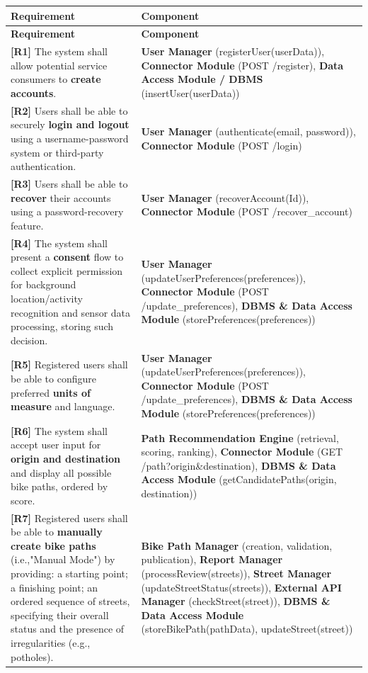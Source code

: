 \documentclass{Configuration_Files/PoliMi3i_thesis}
\begin{document}
    \begin{longtable}{|p{}|p{}|}
    
    \hline
    \textbf{Requirement} & \textbf{Component} \\
    \hline
    \endfirsthead
    
    \hline
    \textbf{Requirement} & \textbf{Component} \\
    \hline
    \endhead
    
    \textbf{[R1]} The system shall allow potential service consumers to \textbf{create accounts}. & \textbf{User Manager} (registerUser(userData)), \textbf{Connector Module} (POST /register), \textbf{Data Access Module / DBMS} (insertUser(userData)) \\
    \hline
    \textbf{[R2]} Users shall be able to securely \textbf{login and logout} using a username-password system or third-party authentication. & \textbf{User Manager} (authenticate(email, password)), \textbf{Connector Module} (POST /login) \\
    \hline
    \textbf{[R3]} Users shall be able to \textbf{recover} their accounts using a password-recovery feature. & \textbf{User Manager} (recoverAccount(Id)), \textbf{Connector Module} (POST /recover\_account) \\
    \hline
    \textbf{[R4]} The system shall present a \textbf{consent} flow to collect explicit permission for background location/activity recognition and sensor data processing, storing such decision. & \textbf{User Manager} (updateUserPreferences(preferences)), \textbf{Connector Module} (POST /update\_preferences), \textbf{DBMS \& Data Access Module} (storePreferences(preferences)) \\
    \hline
    \textbf{[R5]} Registered users shall be able to configure preferred \textbf{units of measure} and language. & \textbf{User Manager} (updateUserPreferences(preferences)), \textbf{Connector Module} (POST /update\_preferences), \textbf{DBMS \& Data Access Module} (storePreferences(preferences)) \\
    \hline
    \textbf{[R6]} The system shall accept user input for \textbf{origin and destination} and display all possible bike paths, ordered by score. & \textbf{Path Recommendation Engine} (retrieval, scoring, ranking), \textbf{Connector Module} (GET /path?origin\&destination), \textbf{DBMS \& Data Access Module} (getCandidatePaths(origin, destination)) \\
    \hline
    \textbf{[R7]} Registered users shall be able to \textbf{manually create bike paths} (i.e.,"Manual Mode") by providing: a starting point; a finishing point; an ordered sequence of streets, specifying their overall status and the presence of irregularities (e.g., potholes). & \textbf{Bike Path Manager} (creation, validation, publication), \textbf{Report Manager} (processReview(streets)), \textbf{Street Manager} (updateStreetStatus(streets)), \textbf{External API Manager} (checkStreet(street)), \textbf{DBMS \& Data Access Module} (storeBikePath(pathData), updateStreet(street)) \\

\end{longtable}
\end{document}
